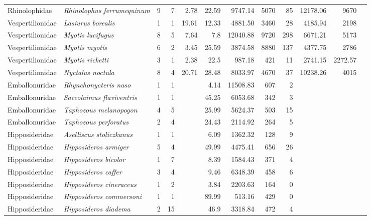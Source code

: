 \begin{landscape}
\begin{longtable}{@{}llrrrrrrrrrl@{}}
  Rhinolophidae & \emph{Rhinolophus ferrumequinum} & 9 & 7 & 2.78 & 22.59 & 9747.14 & 5070 & 85 & 12178.06 & 9670 & \cite{burns2014correlates} \\ 
  Vespertilionidae & \emph{Lasiurus borealis} & 1 & 1 & 19.61 & 12.33 & 4881.50 & 3460 & 28 & 4185.94 & 2198 & \cite{vonhofgenetic} \\ 
  Vespertilionidae & \emph{Myotis lucifugus} & 8 & 5 & 7.64 & 7.8 & 12040.88 & 9720 & 298 & 6671.21 & 5173 & \cite{vonhof2015range} \\ 
  Vespertilionidae & \emph{Myotis myotis} & 6 & 2 & 3.45 & 25.59 & 3874.58 & 8880 & 137 & 4377.75 & 2786 & \cite{burns2014correlates} \\ 
  Vespertilionidae & \emph{Myotis ricketti} & 3 & 1 & 2.38 & 22.5 & 987.18 & 421 & 11 & 2741.15 & 2272.57 & \cite{lu2013phylogeography} \\ 
  Vespertilionidae & \emph{Nyctalus noctula} & 8 & 4 & 20.71 & 28.48 & 8033.97 & 4670 & 37 & 10238.26 & 4015 & \cite{burns2014correlates} \\ 
  Emballonuridae & \emph{Rhynchonycteris naso} & 1 & 1 &  & 4.14 & 11508.83 & 607 & 2 &  &  &  \\ 
  Emballonuridae & \emph{Saccolaimus flaviventris} & 1 & 1 &  & 45.25 & 6053.68 & 342 & 3 &  &  &  \\ 
  Emballonuridae & \emph{Taphozous melanopogon} & 4 & 5 &  & 25.99 & 5624.37 & 503 & 15 &  &  &  \\ 
  Emballonuridae & \emph{Taphozous perforatus} & 2 & 4 &  & 24.43 & 2114.92 & 264 & 5 &  &  &  \\ 
  Hipposideridae & \emph{Aselliscus stoliczkanus} & 1 & 1 &  & 6.09 & 1362.32 & 128 & 9 &  &  &  \\ 
  Hipposideridae & \emph{Hipposideros armiger} & 5 & 4 &  & 49.99 & 4475.41 & 656 & 26 &  &  &  \\ 
  Hipposideridae & \emph{Hipposideros bicolor} & 1 & 7 &  & 8.39 & 1584.43 & 371 & 4 &  &  &  \\ 
  Hipposideridae & \emph{Hipposideros caffer} & 3 & 4 &  & 9.46 & 6348.39 & 458 & 6 &  &  &  \\ 
  Hipposideridae & \emph{Hipposideros cineraceus} & 1 & 2 &  & 3.84 & 2203.63 & 164 & 0 &  &  &  \\ 
  Hipposideridae & \emph{Hipposideros commersoni} & 1 & 1 &  & 89.99 & 513.16 & 429 & 0 &  &  &  \\ 
  Hipposideridae & \emph{Hipposideros diadema} & 2 & 15 &  & 46.9 & 3318.84 & 472 & 4 &  &  &  \\ 

\end{longtable}
\end{landscape}
